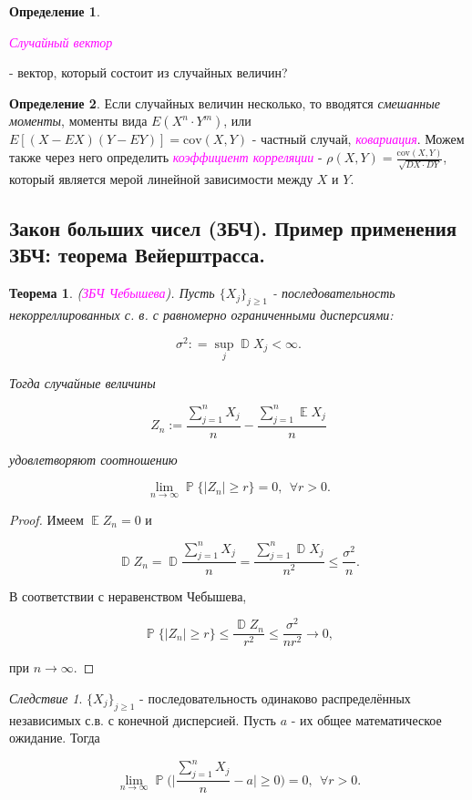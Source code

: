 \documentclass[a4paper,100pt]{article}
\theoremstyle{indented}
\newtheorem{theorem}{Теорема}
\theoremstyle{definition}
\newtheorem{defn}{Определение}
\theoremstyle{remark}
\newtheorem{cons}{Следствие}
\DeclareMathOperator{\ra}{\rightarrow}
\DeclareMathOperator{\PP}{\mathbb{P}}
\DeclareMathOperator{\DD}{\mathbb{D}}
\DeclareMathOperator{\EE}{\mathbb{E}}
\begin{document}
\begin{defn}
  \hypertarget{n18}{\textcolor{magenta}{\textit{Случайный вектор}}} - вектор, который состоит из случайных величин?
\end{defn}

\begin{defn}
  Если случайных величин несколько, то вводятся \textit{смешанные моменты}, моменты вида $E(X^n\cdot Y^m)$, или $E[(X-EX)(Y-EY)]=\text{cov}(X, Y)$ - частный случай, \hypertarget{n19}{\textcolor{magenta}{\textit{ковариация}}}. Можем также через него определить \hypertarget{n20}{\textcolor{magenta}{\textit{коэффициент корреляции}}} - $\rho(X, Y)=\frac{\text{cov}(X, Y)}{\sqrt{DX\cdot DY}}$, который является мерой линейной зависимости между $X$ и $Y$. 
\end{defn}

\subsection{Закон больших чисел (ЗБЧ). Пример применения ЗБЧ: теорема Вейерштрасса.} 

\begin{theorem}
  (\hypertarget{n21}{\textcolor{magenta}{\textit{ЗБЧ Чебышева}}}). Пусть $\{X_j\}_{j\geq 1}$ - последовательность некорреллированных с. в. с равномерно ограниченными дисперсиями:

  \[
    \sigma^2 : = \sup_j \DD X_j < \infty. 
  \]

  Тогда случайные величины 

  \[
    Z_n:= \frac{\sum_{j=1}^n X_j}{n} - \frac{\sum_{j=1}^n \EE X_j}{n}
  \]

  удовлетворяют соотношению

  \[
    \lim_{n \ra \infty} \PP \{|Z_n|\geq r\} = 0, \: \: \forall r > 0. 
  \]
\end{theorem}

\begin{proof}
  Имеем $\EE Z_n = 0$ и 

  \[
    \DD Z_n = \DD \frac{\sum_{j=1}^n X_j}{n} = \frac{\sum_{j=1}^n \DD X_j}{n^2} \leq \frac{\sigma^2}{n}. 
  \]

  В соответствии с неравенством Чебышева,

  \[
    \PP\{|Z_n|\geq r\} \leq \frac{\DD Z_n}{r^2}\leq \frac{\sigma^2}{nr^2} \ra 0, 
  \]

  при $n \ra \infty$.
\end{proof}

\begin{cons}
  $\{X_j\}_{j\geq 1}$ - последовательность одинаково распределённых независимых с.в. с конечной дисперсией. Пусть $a$ - их общее математическое ожидание. Тогда 

  \[
    \lim_{n \ra \infty} \PP \biggl( \bigg| \frac{\sum_{j=1}^n X_j}{n} - a \bigg| \geq 0 \biggr) = 0, \: \: \forall r > 0. 
  \]

\end{cons}
\end{document}
